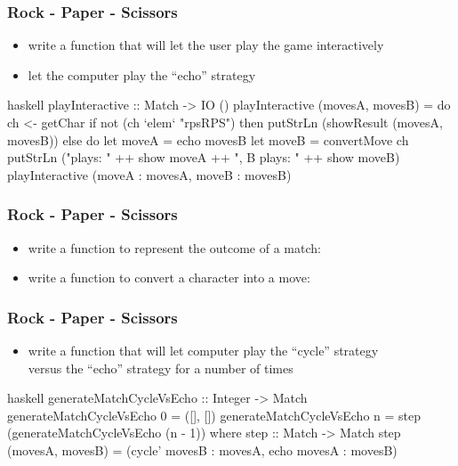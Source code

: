 \documentclass[dvipsnames]{beamer}
\theoremstyle{plain}
\begin{document}
\begin{frame}[fragile]
  \frametitle{Rock - Paper - Scissors}

  \begin{itemize}
    \item write a function that will let the user play the game interactively
    \item let the computer play the ``echo'' strategy
  \end{itemize}

  \pause
  \begin{exampleblock}{}
    \begin{pygments}{haskell}
playInteractive :: Match -> IO ()
playInteractive (movesA, movesB) =
    do ch <- getChar
       if not (ch `elem` "rpsRPS")
           then putStrLn (showResult (movesA, movesB))
           else do let moveA = echo movesB
                   let moveB = convertMove ch
                   putStrLn ("\nA plays: " ++
                             show moveA ++
                             ", B plays: " ++
                             show moveB)
                   playInteractive (moveA : movesA,
                                    moveB : movesB)
    \end{pygments}
  \end{exampleblock}
\end{frame}

\begin{frame}
  \frametitle{Rock - Paper - Scissors}

  \begin{itemize}
    \item write a function to represent the outcome of a match:\\
      \smallskip
    \item write a function to convert a character into a move:\\
      \smallskip
  \end{itemize}
\end{frame}

\begin{frame}[fragile]
  \frametitle{Rock - Paper - Scissors}

  \begin{itemize}
    \item write a function that will let computer play the ``cycle'' strategy\\
      versus the ``echo'' strategy for a number of times
  \end{itemize}

  \pause
  \begin{exampleblock}{}
    \begin{pygments}{haskell}
generateMatchCycleVsEcho :: Integer -> Match
generateMatchCycleVsEcho 0 = ([], [])
generateMatchCycleVsEcho n =
    step (generateMatchCycleVsEcho (n - 1))
      where
        step :: Match -> Match
        step (movesA, movesB) =
            (cycle' movesB : movesA,
             echo movesA : movesB)
    \end{pygments}
  \end{exampleblock}
\end{frame}
\end{document}

